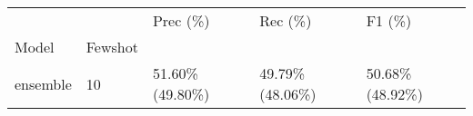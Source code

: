 \begin{tabular}{lllll}
\toprule
         &    &         Prec (\%) &          Rec (\%) &           F1 (\%) \\
Model & Fewshot &                  &                  &                  \\
\midrule
ensemble & 10 &  51.60\% (49.80\%) &  49.79\% (48.06\%) &  50.68\% (48.92\%) \\
\bottomrule
\end{tabular}
